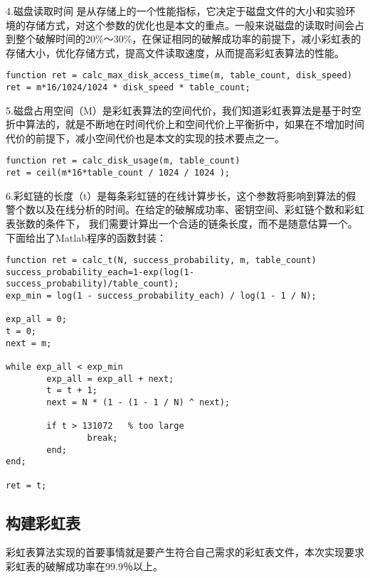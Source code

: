 4.磁盘读取时间 \quad 是从存储上的一个性能指标，它决定于磁盘文件的大小和实验环境的存储方式，对这个参数的优化也是本文的重点。一般来说磁盘的读取时间会占到整个破解时间的20\%～30\%，在保证相同的破解成功率的前提下，减小彩虹表的存储大小，优化存储方式，提高文件读取速度，从而提高彩虹表算法的性能。
\begin{lstlisting}
function ret = calc_max_disk_access_time(m, table_count, disk_speed)
ret = m*16/1024/1024 * disk_speed * table_count;
\end{lstlisting}

5.磁盘占用空间（M）\quad 是彩虹表算法的空间代价，我们知道彩虹表算法是基于时空折中算法的，就是不断地在时间代价上和空间代价上平衡折中，如果在不增加时间代价的前提下，减小空间代价也是本文的实现的技术要点之一。
\begin{lstlisting}
function ret = calc_disk_usage(m, table_count)
ret = ceil(m*16*table_count / 1024 / 1024 );
\end{lstlisting}

6.彩虹链的长度（t）\quad 是每条彩虹链的在线计算步长，这个参数将影响到算法的假警个数以及在线分析的时间。在给定的破解成功率、密钥空间、彩虹链个数和彩虹表张数的条件下，
我们需要计算出一个合适的链条长度，而不是随意估算一个。下面给出了Matlab程序的函数封装：
\begin{lstlisting}
function ret = calc_t(N, success_probability, m, table_count)
success_probability_each=1-exp(log(1-success_probability)/table_count);
exp_min = log(1 - success_probability_each) / log(1 - 1 / N);

exp_all = 0;
t = 0;
next = m;

while exp_all < exp_min
        exp_all = exp_all + next;
        t = t + 1;
        next = N * (1 - (1 - 1 / N) ^ next);

        if t > 131072   % too large
                break;
        end;
end;

ret = t;
\end{lstlisting}
\subsection{构建彩虹表}
彩虹表算法实现的首要事情就是要产生符合自己需求的彩虹表文件，本次实现要求彩虹表的破解成功率在99.9％以上。

